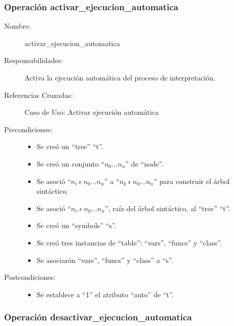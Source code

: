 \subsubsection{Operación activar\_ejecucion\_automatica}

	\begin{description}
		\item [Nombre:] activar\_ejecucion\_automatica
		\item [Responsabilidades:] Activa la ejecución automática del proceso de interpretación.
		\item [Referencias Cruzadas: ] Caso de Uso: Activar ejecución automática
      \item [Precondiciones:] \hfill
         \begin {itemize}
         \item Se creó un ``tree'' ``t''.
         \item Se creó un conjunto ``$n_0...n_n$'' de ``node''.
         \item Se asoció ``$n_i\ \epsilon\ n_0...n_n$'' a ``$n_k\ \epsilon\ n_0...n_n$'' para construir el árbol sintáctico.
         \item Se asoció  ``$n_r\ \epsilon\ n_0...n_n$'', raíz del árbol sintáctico, al ``tree'' ``t''.
         \item Se creó un ``symbols'' ``s''.
         \item Se creó tres instancias de ``table'': ``vars'', ``funcs'' y ``class''.
         \item Se asociarón ``vars'', ``funcs'' y ``class'' a ``s''.
      \end{itemize}
      \item [Postcondiciones:] \hfill
      \begin {itemize}
         \item Se establece a ``1'' el atributo ``auto'' de ``t''.
      \end{itemize}
	\end{description} 


\subsubsection{Operación desactivar\_ejecucion\_automatica}

